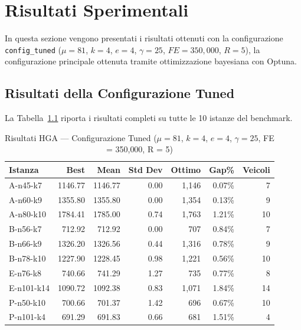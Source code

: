 \chapter{Risultati Sperimentali}

In questa sezione vengono presentati i risultati ottenuti con la configurazione
\texttt{config\_tuned} ($\mu = 81$, $k = 4$, $e = 4$, $\gamma = 25$,
$FE = 350{,}000$, $R = 5$), la configurazione principale ottenuta tramite
ottimizzazione bayesiana con Optuna.

\section{Risultati della Configurazione Tuned}

La Tabella~\ref{tab:results-tuned} riporta i risultati completi su tutte le 10
istanze del benchmark.

\begin{table}[H]
\centering
\caption{Risultati HGA --- Configurazione Tuned ($\mu=81$, $k=4$, $e=4$, $\gamma=25$, FE = 350{,}000, R = 5)}
\label{tab:results-tuned}
\begin{tabular}{@{}lrrrrrr@{}}
\toprule
\textbf{Istanza} & \textbf{Best} & \textbf{Mean} & \textbf{Std Dev} & \textbf{Ottimo} & \textbf{Gap\%} & \textbf{Veicoli} \\
\midrule
A-n45-k7     &  1146.77 &  1146.77 &     0.00 &   1{,}146 &  0.07\% &       7 \\
A-n60-k9     &  1355.80 &  1355.80 &     0.00 &   1{,}354 &  0.13\% &       9 \\
A-n80-k10    &  1784.41 &  1785.00 &     0.74 &   1{,}763 &  1.21\% &      10 \\
B-n56-k7     &   712.92 &   712.92 &     0.00 &     707 &  0.84\% &       7 \\
B-n66-k9     &  1326.20 &  1326.56 &     0.44 &   1{,}316 &  0.78\% &       9 \\
B-n78-k10    &  1227.90 &  1228.45 &     0.98 &   1{,}221 &  0.56\% &      10 \\
E-n76-k8     &   740.66 &   741.29 &     1.27 &     735 &  0.77\% &       8 \\
E-n101-k14   &  1090.72 &  1092.38 &     0.83 &   1{,}071 &  1.84\% &      14 \\
P-n50-k10    &   700.66 &   701.37 &     1.42 &     696 &  0.67\% &      10 \\
P-n101-k4    &   691.29 &   691.83 &     0.66 &     681 &  1.51\% &       4 \\
\bottomrule
\end{tabular}
\end{table}

